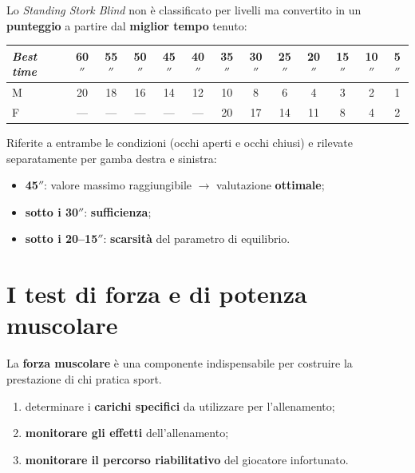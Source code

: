 Lo \textit{Standing Stork Blind} non è classificato per livelli ma convertito in un
\textbf{punteggio} a partire dal \textbf{miglior tempo} tenuto:

\begin{table}[htbp]
  \centering
  \small
  \renewcommand{\arraystretch}{1.2}
  \begin{tabularx}{\textwidth}{|X|c|c|c|c|c|c|c|c|c|c|c|c|}
    \hline
    \textbf{\textit{Best time}} & 60$''$ & 55$''$ & 50$''$ & 45$''$ & 40$''$ & 35$''$ & 30$''$ &
      25$''$ & 20$''$ & 15$''$ & 10$''$ & 5$''$ \\
    \hline
    M & 20 & 18 & 16 & 14 & 12 & 10 & 8 & 6 & 4 & 3 & 2 & 1 \\
    \hline
    F & --- & --- & --- & --- & --- & 20 & 17 & 14 & 11 & 8 & 4 & 2 \\
    \hline
  \end{tabularx}
\end{table}

Riferite a entrambe le condizioni (occhi aperti e occhi chiusi) e rilevate separatamente per gamba
destra e sinistra:
\begin{itemize}
  \item \textbf{45$''$}: valore massimo raggiungibile $\rightarrow$ valutazione \textbf{ottimale};
  \item \textbf{sotto i 30$''$}: \textbf{sufficienza};
  \item \textbf{sotto i 20--15$''$}: \textbf{scarsità} del parametro di equilibrio.
\end{itemize}

\section{I test di forza e di potenza muscolare}

La \textbf{forza muscolare} è una componente indispensabile per costruire la prestazione di chi
pratica sport.

\begin{enumerate}
  \item determinare i \textbf{carichi specifici} da utilizzare per l'allenamento;
  \item \textbf{monitorare gli effetti} dell'allenamento;
  \item \textbf{monitorare il percorso riabilitativo} del giocatore infortunato.
\end{enumerate}

